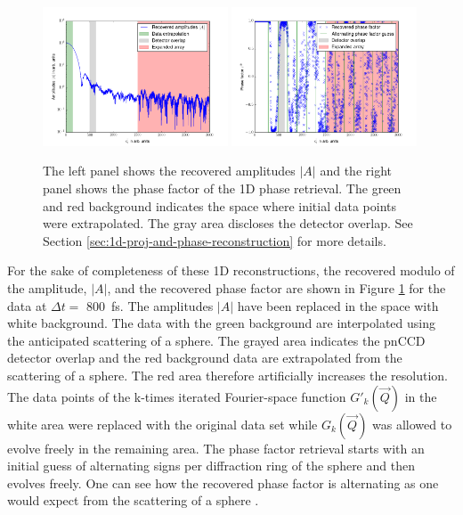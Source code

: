 \begin{figure}
	\centering
		\includegraphics[width=0.49\textwidth]{images/results/amplitude-discussion.png}
		\includegraphics[width=0.49\textwidth]{images/results/phase-discussion.png}
	\caption[Recovered Amplitudes $\lvert A\rvert$ and phase factor of 1D reconstruction]{The left panel shows the recovered amplitudes $\lvert A\rvert$ and the right panel shows the phase factor of the 1D phase retrieval. The green and red background indicates the space where initial data points were extrapolated. The gray area discloses the detector overlap. See Section \ref{sec:1d-proj-and-phase-reconstruction} for more details.}
	\label{fig:amplitude-phase}
\end{figure}
For the sake of completeness of these 1D reconstructions, the recovered modulo of the amplitude, $\lvert A\rvert$, and the recovered phase factor are shown in Figure \ref{fig:amplitude-phase} for the data at $\Delta t =$ \SI{800}{\femto\second}. The amplitudes $\lvert A\rvert$ have been replaced in the space with white background. The data with the green background are interpolated using the anticipated scattering of a sphere. The grayed area indicates the pnCCD detector overlap and the red background data are extrapolated from the scattering of a sphere. The red area therefore artificially increases the resolution. The data points of the k-times iterated Fourier-space function $G'_{k}(\vec{Q})$ in the white area were replaced with the original data set while $G_{k}(\vec{Q})$ was allowed to evolve freely in the remaining area. The phase factor retrieval starts with an initial guess of alternating signs per diffraction ring of the sphere and then evolves freely. One can see how the recovered phase factor is alternating as one would expect from the scattering of a sphere \cite{Guinier-1955-JWS}.
%
%
%
